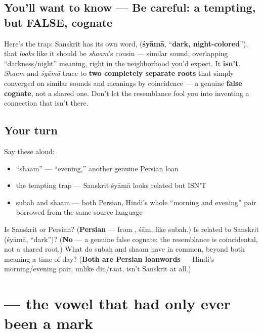 \subsection*{You'll want to know — Be careful: a tempting, but FALSE, cognate}
Here's the trap: Sanskrit has its own word, \textbf{} (\textbf{śyāmā}, \textquotedblleft{}\textbf{dark, night-colored}\textquotedblright{}), that \emph{looks} like it should be \emph{shaam}'s cousin — similar sound, overlapping \textquotedblleft{}darkness/night\textquotedblright{} meaning, right in the neighborhood you'd expect. It \textbf{isn't}. \emph{Shaam} and \emph{śyāmā} trace to \textbf{two completely separate roots} that simply converged on similar sounds and meanings by coincidence — a genuine \textbf{false cognate}, not a shared one. Don't let the resemblance fool you into inventing a connection that isn't there.

\subsection*{Your turn}
Say these aloud:

\begin{itemize}
\raggedright
  \item \textquotedblleft{}shaam\textquotedblright{} — \textquotedblleft{}evening,\textquotedblright{} another genuine Persian loan
  \item the tempting trap — Sanskrit śyāmā looks related but ISN'T
  \item subah and shaam — both Persian, Hindi's whole \textquotedblleft{}morning and evening\textquotedblright{} pair borrowed from the same source language
\end{itemize}

\begin{tcolorbox}[breakable,colback=teal!4,colframe=teal!35!black,title={Before you move on}]
Is  Sanskrit or Persian? (\textbf{Persian} — from , śām, like subah.) Is  related to Sanskrit  (śyāmā, \textquotedblleft{}dark\textquotedblright{})? (\textbf{No} — a genuine false cognate; the resemblance is coincidental, not a shared root.) What do subah and shaam have in common, beyond both meaning a time of day? (\textbf{Both are Persian loanwords} — Hindi's morning/evening pair, unlike din/raat, isn't Sanskrit at all.)
\end{tcolorbox}
\section[\texorpdfstring{\hi{ए} (e)}{ए (e)}]{ — the vowel that had only ever been a mark}

